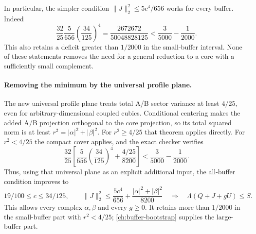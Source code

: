 In particular, the simpler condition $\|J\|_2^2\le5c^4/656$ works for
every buffer. Indeed
\[
 \frac{32}{25}\frac5{656}\left(\frac{34}{125}\right)^4
 =\frac{2672672}{50048828125}
 <\frac3{5000}-\frac1{2000}.
\]
This also retains a deficit greater than $1/2000$ in the small-buffer
interval. None of these statements removes the need for a general
reduction to a core with a sufficiently small complement.

\paragraph{Removing the minimum by the universal profile plane.}
The new universal profile plane treats total A/B sector variance at least
$4/25$, even for arbitrary-dimensional coupled cubics. Conditional
centering makes the added A/B projection orthogonal to the core
projection, so its total squared norm is at least
$r^2=|\alpha|^2+|\beta|^2$.
For $r^2\ge4/25$ that theorem applies directly. For $r^2<4/25$ the
compact cover applies, and the exact checker verifies
\[
 \frac{32}{25}\left[
 \frac5{656}\left(\frac{34}{125}\right)^4+
 \frac{4/25}{8200}\right]
 <\frac3{5000}-\frac1{2000}.
\]
Thus, using that universal plane as an explicit additional input, the
all-buffer condition improves to
\[
 \boxed{19/100\le c\le34/125,\qquad
 \|J\|_2^2\le\frac{5c^4}{656}
             +\frac{|\alpha|^2+|\beta|^2}{8200}
 \quad\Longrightarrow\quad\Lambda(Q+J+gU)\le S.}
\]
This allows every complex $\alpha,\beta$ and every $g\ge0$. It retains
more than $1/2000$ in the small-buffer part with $r^2<4/25$; \autoref{ch:buffer-bootstrap}
supplies the large-buffer part.
